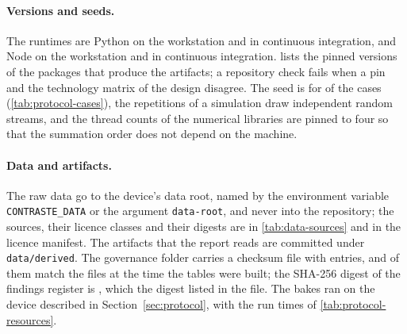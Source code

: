 \paragraph{Versions and seeds.} The runtimes are Python \rsPythonDev{} on the workstation and \rsPythonCi{} in continuous integration, and Node \rsNodeDev{} on the workstation and \rsNodeCi{} in continuous integration.  lists the pinned versions of the packages that produce the artifacts; a repository check fails when a pin and the technology matrix of the design disagree. The seed is \rsSeedDefault{} for \rsSeedDefaultCases{} of the \rsCasesResult{} cases (\cref{tab:protocol-cases}), the repetitions of a simulation draw independent random streams, and the thread counts of the numerical libraries are pinned to four so that the summation order does not depend on the machine.



\paragraph{Data and artifacts.} The raw data go to the device's data root, named by the environment variable \texttt{CONTRASTE\_DATA} or the argument \texttt{\ttdash data-root}, and never into the repository; the sources, their licence classes and their digests are in \cref{tab:data-sources} and in the licence manifest. The artifacts that the report reads are committed under \texttt{data/derived}. The governance folder carries a checksum file with \rsShaEntries{} entries, and \rsShaMatching{} of them match the files at the time the tables were built; the SHA-256 digest of the findings register is \texttt{\rsShaFindings{}}, which \rsShaFindingsMatch{} the digest listed in the file. The bakes ran on the device described in Section~\ref{sec:protocol}, with the run times of \cref{tab:protocol-resources}.
